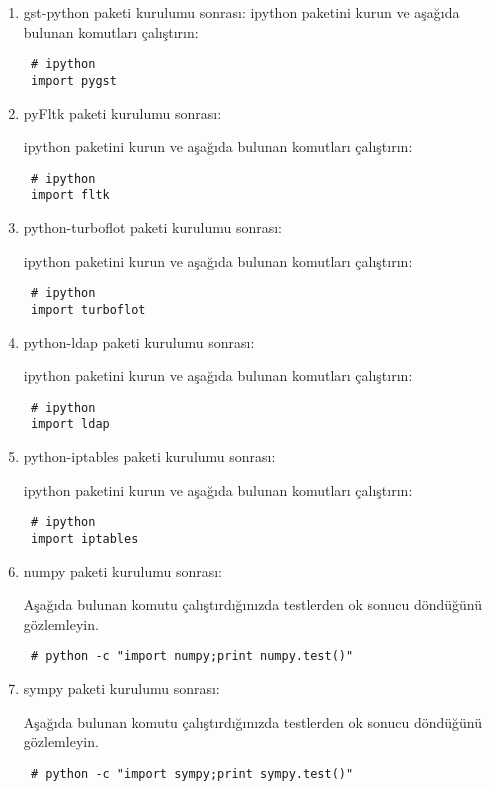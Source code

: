 \documentclass[a4paper,10pt]{article}
\begin{document}
\begin{enumerate}
\item gst-python paketi kurulumu sonrası:
ipython paketini kurun ve aşağıda bulunan komutları çalıştırın:
\begin{verbatim}
 # ipython
 import pygst
\end{verbatim}

\item pyFltk paketi kurulumu sonrası:

ipython paketini kurun ve aşağıda bulunan komutları çalıştırın:
\begin{verbatim}
 # ipython
 import fltk
\end{verbatim}


\item python-turboflot paketi kurulumu sonrası:

ipython paketini kurun ve aşağıda bulunan komutları çalıştırın:
\begin{verbatim}
 # ipython
 import turboflot
\end{verbatim}

\item python-ldap paketi kurulumu sonrası:

ipython paketini kurun ve aşağıda bulunan komutları çalıştırın:
\begin{verbatim}
 # ipython
 import ldap
\end{verbatim}

\item python-iptables paketi kurulumu sonrası:

ipython paketini kurun ve aşağıda bulunan komutları çalıştırın:
\begin{verbatim}
 # ipython
 import iptables
\end{verbatim}

\item numpy paketi kurulumu sonrası:

Aşağıda bulunan komutu çalıştırdığınızda testlerden ok sonucu döndüğünü gözlemleyin.
\begin{verbatim}
 # python -c "import numpy;print numpy.test()"
\end{verbatim}

\item sympy paketi kurulumu sonrası:

Aşağıda bulunan komutu çalıştırdığınızda testlerden ok sonucu döndüğünü gözlemleyin.
\begin{verbatim}
 # python -c "import sympy;print sympy.test()"
\end{verbatim}


\end{enumerate}
\end{document}
